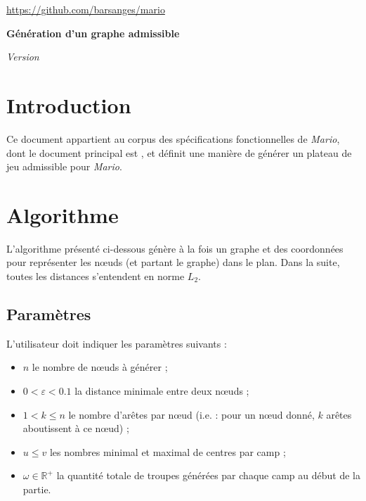 \documentclass[a4paper,11pt,headings=normal]{scrartcl}
\theoremstyle{mythm}
\begin{document}
\begin{flushleft}
{\small \sffamily \url{https://github.com/barsanges/mario}}\vspace{0.8em}

{\raggedleft \bfseries\LARGE Génération d'un graphe
  admissible}\vspace{0.8em}

{\itshape Version }
\end{flushleft}

\section{Introduction}

Ce document appartient au corpus des spécifications fonctionnelles de
\emph{Mario}, dont le document principal est
\cite{MarioReglesCourant}, et définit une manière de générer un
plateau de jeu admissible pour \emph{Mario}.

\section{Algorithme}
\label{algorithme}

L'algorithme présenté ci-dessous génère à la fois un graphe et des
coordonnées pour représenter les nœuds (et partant le graphe) dans le
plan. Dans la suite, toutes les distances s'entendent en norme $L_2$.

\subsection{Paramètres}
\label{algorithme:parametres}

L'utilisateur doit indiquer les paramètres suivants :
\begin{itemize}
  \item $n$ le nombre de nœuds à générer ;

  \item $0 < \varepsilon < 0.1$ la distance minimale entre deux nœuds
    ;

  \item $1 < k \leq n$ le nombre d'arêtes par nœud (i.e. : pour un
    nœud donné, $k$ arêtes aboutissent à ce nœud) ;

  \item $u \leq v$ les nombres minimal et maximal de centres par camp
    ;

  \item $\omega \in \mathbb{R}^+$ la quantité totale de troupes
    générées par chaque camp au début de la partie.
\end{itemize}
\end{document}
